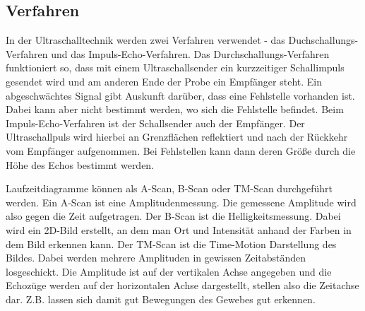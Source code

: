 \subsection{Verfahren}
In der Ultraschalltechnik werden zwei Verfahren verwendet - 
das Duchschallungs-Verfahren und das Impuls-Echo-Verfahren. 
\newline
Das Durchschallungs-Verfahren funktioniert so, dass mit einem 
Ultraschallsender ein kurzzeitiger Schallimpuls gesendet wird 
und am anderen Ende der Probe ein Empfänger steht. Ein 
abgeschwächtes Signal gibt Auskunft darüber, dass eine 
Fehlstelle vorhanden ist. Dabei kann aber nicht bestimmt 
werden, wo sich die Fehlstelle befindet.
\newline
Beim Impuls-Echo-Verfahren ist der Schallsender auch der 
Empfänger. Der Ultraschallpuls wird hierbei an Grenzflächen 
reflektiert und nach der Rückkehr vom Empfänger aufgenommen. 
Bei Fehlstellen kann dann deren Größe durch die Höhe des Echos
bestimmt werden. 

\noindent Laufzeitdiagramme können als A-Scan, B-Scan oder TM-Scan 
durchgeführt werden. Ein A-Scan ist eine Amplitudenmessung. Die gemessene Amplitude wird also gegen die Zeit aufgetragen. Der B-Scan ist die Helligkeitsmessung. Dabei wird ein 2D-Bild erstellt, an dem man Ort und Intensität anhand der Farben in dem Bild erkennen kann. Der TM-Scan ist die Time-Motion Darstellung des Bildes. Dabei werden mehrere Amplituden in gewissen Zeitabständen losgeschickt. Die Amplitude ist auf der vertikalen Achse angegeben und die Echozüge werden auf der horizontalen Achse dargestellt, stellen also die Zeitachse dar. Z.B. lassen sich damit gut Bewegungen des Gewebes gut erkennen.  %
